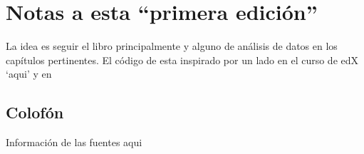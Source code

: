 \chapter{Notas a esta ``primera edición''}%
\label{cha:Notas-1era-ed}

La idea es seguir el libro \autocite{hogg_introduction_2013} principalmente y alguno de análisis de datos en los
capítulos pertinentes. 
El código de \R esta inspirado por un lado en el curso de edX `aqui' y en

\section*{Colofón}
\label{colofon}

Información de las fuentes aqui
